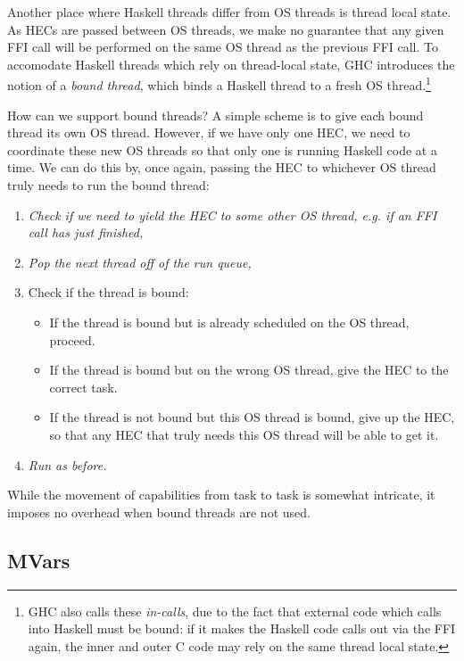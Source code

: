 Another place where Haskell threads differ from OS threads is thread
local state.  As HECs are passed between OS threads, we make no
guarantee that any given FFI call will be performed on the same OS
thread as the previous FFI call.  To accomodate Haskell threads which
rely on thread-local state, GHC introduces the notion of a \emph{bound thread},
which binds a Haskell thread to a fresh OS thread.\footnote{GHC
    also calls these \emph{in-calls}, due to the fact that external code
    which calls into Haskell must be bound: if it makes the Haskell code
calls out via the FFI again, the inner and outer C code may rely on the
same thread local state.}

How can we support bound threads?  A simple scheme is to give each bound
thread its own OS thread.  However, if we have only one HEC, we
need to coordinate these new OS threads so that only one is running
Haskell code at a time.  We can do this by, once again, passing the
HEC to whichever OS thread truly needs to run the bound thread:

\begin{enumerate}
    \item \emph{Check if we need to yield the HEC to some other OS thread, e.g. if an FFI call has just finished,}
    \item \emph{Pop the next thread off of the run queue,}
    \item Check if the thread is bound:
        \begin{itemize}
            \item If the thread is bound but is already scheduled on the OS thread, proceed.
            \item If the thread is bound but on the wrong OS thread, give the HEC to the correct task.
            \item If the thread is not bound but this OS thread is bound, give up the HEC, so that any HEC that truly needs this OS thread will be able to get it.
        \end{itemize}
    \item \emph{Run as before.}
\end{enumerate}

While the movement of capabilities from task to task is somewhat intricate,
it imposes no overhead when bound threads are not used.

\subsection{MVars}
\label{sec:MVar}

